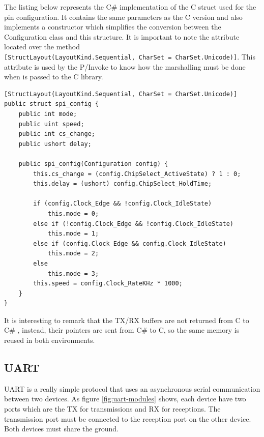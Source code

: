The listing below represents the C\# implementation of the C struct used for the pin configuration. It contains the same parameters as the C version and also implements a constructor which simplifies the conversion between the Configuration class and this structure. It is important to note the attribute located over the method 
\\
\verb![StructLayout(LayoutKind.Sequential, CharSet = CharSet.Unicode)]!. This attribute is used by the P/Invoke to know how the marshalling must be done when is passed to the C library.

\begin{lstlisting}[language=CSharp, caption={SPI.cs - spi\_config struct}]
[StructLayout(LayoutKind.Sequential, CharSet = CharSet.Unicode)]
public struct spi_config {
    public int mode;
    public uint speed;
    public int cs_change;
    public ushort delay;

    public spi_config(Configuration config) {
        this.cs_change = (config.ChipSelect_ActiveState) ? 1 : 0;
        this.delay = (ushort) config.ChipSelect_HoldTime;

        if (config.Clock_Edge && !config.Clock_IdleState)
            this.mode = 0;
        else if (!config.Clock_Edge && !config.Clock_IdleState)
            this.mode = 1;
        else if (config.Clock_Edge && config.Clock_IdleState)
            this.mode = 2;
        else
            this.mode = 3;
        this.speed = config.Clock_RateKHz * 1000;
    }
}
\end{lstlisting}

It is interesting to remark that the \gls{TX}/\gls{RX} buffers are not returned from C to C\# , instead, their pointers are sent from C\# to C, so the same memory is reused in both environments. 

\subsection{UART}\label{SS:IOSharp-UART}
UART is a really simple protocol that uses an asynchronous serial communication between two devices. As figure \ref{fig:uart-modules} shows, each device have two ports which are the \gls{TX} for transmissions and \gls{RX} for receptions. The transmission port must be connected to the reception port on the other device. Both devices must share the ground.

